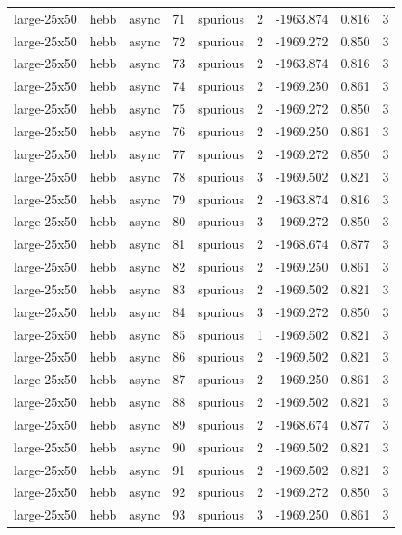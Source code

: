 \begin{tabular}{lllrlrrrr}
large-25x50 & hebb & async & 71 & spurious & 2 & -1963.874 & 0.816 & 3 \\
large-25x50 & hebb & async & 72 & spurious & 2 & -1969.272 & 0.850 & 3 \\
large-25x50 & hebb & async & 73 & spurious & 2 & -1963.874 & 0.816 & 3 \\
large-25x50 & hebb & async & 74 & spurious & 2 & -1969.250 & 0.861 & 3 \\
large-25x50 & hebb & async & 75 & spurious & 2 & -1969.272 & 0.850 & 3 \\
large-25x50 & hebb & async & 76 & spurious & 2 & -1969.250 & 0.861 & 3 \\
large-25x50 & hebb & async & 77 & spurious & 2 & -1969.272 & 0.850 & 3 \\
large-25x50 & hebb & async & 78 & spurious & 3 & -1969.502 & 0.821 & 3 \\
large-25x50 & hebb & async & 79 & spurious & 2 & -1963.874 & 0.816 & 3 \\
large-25x50 & hebb & async & 80 & spurious & 3 & -1969.272 & 0.850 & 3 \\
large-25x50 & hebb & async & 81 & spurious & 2 & -1968.674 & 0.877 & 3 \\
large-25x50 & hebb & async & 82 & spurious & 2 & -1969.250 & 0.861 & 3 \\
large-25x50 & hebb & async & 83 & spurious & 2 & -1969.502 & 0.821 & 3 \\
large-25x50 & hebb & async & 84 & spurious & 3 & -1969.272 & 0.850 & 3 \\
large-25x50 & hebb & async & 85 & spurious & 1 & -1969.502 & 0.821 & 3 \\
large-25x50 & hebb & async & 86 & spurious & 2 & -1969.502 & 0.821 & 3 \\
large-25x50 & hebb & async & 87 & spurious & 2 & -1969.250 & 0.861 & 3 \\
large-25x50 & hebb & async & 88 & spurious & 2 & -1969.502 & 0.821 & 3 \\
large-25x50 & hebb & async & 89 & spurious & 2 & -1968.674 & 0.877 & 3 \\
large-25x50 & hebb & async & 90 & spurious & 2 & -1969.502 & 0.821 & 3 \\
large-25x50 & hebb & async & 91 & spurious & 2 & -1969.502 & 0.821 & 3 \\
large-25x50 & hebb & async & 92 & spurious & 2 & -1969.272 & 0.850 & 3 \\
large-25x50 & hebb & async & 93 & spurious & 3 & -1969.250 & 0.861 & 3 \\

\end{tabular}
